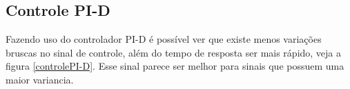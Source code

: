 \documentclass[a4paper,12pt]{article}
\begin{document}
\subsection{Controle PI-D}
\hspace{4ex}Fazendo uso do controlador PI-D é possível ver que existe menos variações bruscas no sinal de controle, além do tempo de resposta ser mais rápido, veja a figura \ref{controlePI-D}. Esse sinal parece ser melhor para sinais que possuem uma maior variancia.
\begin{figure}[H]
     \centering
     \hspace{4ex}
     \\
     \hspace{4ex}
     \\

\end{figure}
\end{document}
